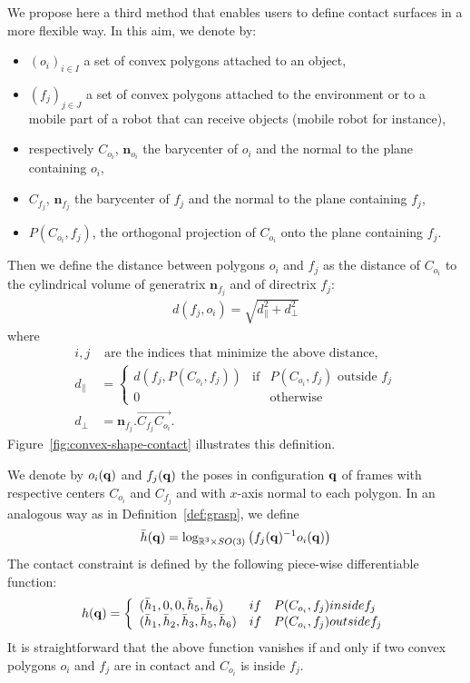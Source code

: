 We propose here a third method that enables users to define contact surfaces in a more flexible way. In this aim, we denote by:
\begin{itemize}
\item $(o_i)_{i\in I}$ a set of convex polygons attached to an object,
\item $(f_j)_{j\in J}$ a set of convex polygons attached to the environment or to a mobile part of a robot that can receive objects (mobile robot for instance),
\item respectively $C_{o_i}$, $\mathbf{n}_{o_i}$ the barycenter of $o_i$ and the normal to the plane containing $o_i$,
\item $C_{f_j}$, $\mathbf{n}_{f_j}$ the barycenter of $f_j$ and the normal to the plane containing $f_j$,
\item $P(C_{o_i},f_j)$, the orthogonal projection of $C_{o_i}$ onto the plane containing $f_j$.
\end{itemize}
Then we define the distance between polygons $o_i$ and $f_j$ as the distance of $C_{o_i}$ to the cylindrical volume of generatrix $\mathbf{n}_{f_j}$ and of directrix $f_j$:
\begin{align}\label{eq:contact-distance}
  d(f_j,o_i) = \sqrt{d_{\parallel}^2 + d_{\perp}^2}
\end{align}
where
\begin{align*}
  i,j & \mbox{ are the indices that minimize the above distance,}\\
d_{\parallel} &= \left\{\begin{array}{lll} d(f_j,P(C_{o_i},f_j))&\mbox{if}& P(C_{o_i},f_j)\mbox{ outside } f_j\\
0 & & \mbox{otherwise}
\end{array}\right. \\
d_{\perp} &= \mathbf{n}_{f_j}.\vec{C_{f_j}C_{o_i}}.
\end{align*}
Figure~\ref{fig:convex-shape-contact} illustrates this definition.

We denote by $o_i(\mathbf{q})$ and $f_j(\mathbf{q})$ the poses in configuration $\mathbf{q}$ of frames with respective centers $C_{o_i}$ and $C_{f_j}$ and with $x$-axis normal to each polygon. In an analogous way as in Definition~\ref{def:grasp}, we define
\begin{equation}\label{eq:convex-shape-contact-hbar}
\bar{h}(\conf) = \log_{\reals^3\times SO(3)} \left(f_{j}(\conf)^{-1}o_i(\conf)\right)
\end{equation}
The contact constraint is defined by the following piece-wise differentiable function:
\begin{equation}\label{eq:convex-shape-contact}
h(\conf) = \left\{\begin{array}{lll}(\bar{h}_1,0,0,\bar{h}_5,\bar{h}_6)&
\mbox{if} & P(C_{o_i},f_j)\mbox{ inside } f_j\\
(\bar{h}_1,\bar{h}_2,\bar{h}_3,\bar{h}_5,\bar{h}_6)&
\mbox{if} & P(C_{o_i},f_j)\mbox{ outside } f_j\end{array}\right.
\end{equation}
It is straightforward that the above function vanishes if and only if two convex polygons $o_i$ and $f_j$ are in contact and $C_{o_i}$ is inside $f_j$.

